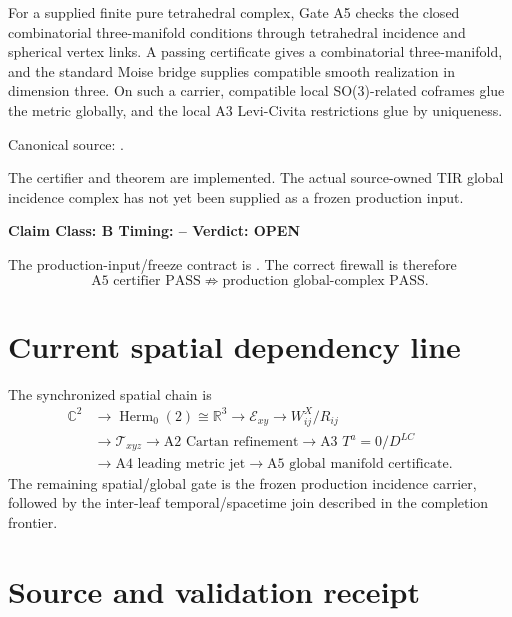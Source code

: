 \documentclass[11pt,a4paper,twoside]{book}
\def\({}%
\def\){}%
\theoremstyle{definition}
\newcommand{\vTwelveStatus}[3]{\par\noindent\textbf{Claim Class: #1 \quad Timing: #2 \quad Verdict: #3}\par}
\begin{document}
For a supplied finite pure tetrahedral complex, Gate A5 checks the closed
combinatorial three-manifold conditions through tetrahedral incidence and
spherical vertex links.  A passing certificate gives a combinatorial
three-manifold, and the standard Moise bridge supplies compatible smooth
realization in dimension three.  On such a carrier, compatible local
\(SO(3)\)-related coframes glue the metric globally, and the local A3
Levi-Civita restrictions glue by uniqueness.

Canonical source:
.

The certifier and theorem are implemented.  The actual source-owned TIR global
incidence complex has not yet been supplied as a frozen production input.
\vTwelveStatus{B}{--}{OPEN}

The production-input/freeze contract is
.
The correct firewall is therefore
\[
\boxed{
\text{A5 certifier PASS}
\not\Rightarrow
\text{production global-complex PASS}.
}
\]

\section{Current spatial dependency line}

The synchronized spatial chain is
\[
\boxed{
\begin{aligned}
\mathbb C^2
&\to\operatorname{Herm}_0(2)\cong\mathbb R^3
\to\mathcal E_{xy}
\to W_{ij}^{X}/R_{ij}\\
&\to\mathcal T_{xyz}
\to\text{A2 Cartan refinement}
\to\text{A3 }T^a=0/D^{LC}\\
&\to\text{A4 leading metric jet}
\to\text{A5 global manifold certificate}.
\end{aligned}
}
\]
The remaining spatial/global gate is the frozen production incidence carrier,
followed by the inter-leaf temporal/spacetime join described in the completion
frontier.

\section{Source and validation receipt}
\end{document}

